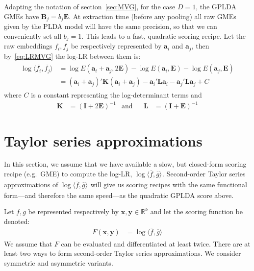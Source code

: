 \documentclass[a4paper,oneside,12pt,english]{report}
\def\expv#1#2{\bigl\langle#1\bigr\rangle_{#2}}
\def\R{\mathbb{R}}
\def\Lmat{\mathbf{L}}
\def\Bmat{\mathbf{B}}
\def\Emat{\mathbf{E}}
\def\Imat{\mathbf{I}}
\def\Kmat{\mathbf{K}}
\def\yvec{\mathbf{y}}
\def\xvec{\mathbf{x}}
\def\avec{\mathbf{a}}
\def\dot#1#2{\expv{#1,#2}{}}
\def\normal#1{\overline{#1}}
\def\dotn#1#2{\dot{\normal{#1}}{\normal{#2}}}
\begin{document}
Adapting the notation of section~\ref{sec:MVG}, for the case $D=1$, the GPLDA GMEs have $\Bmat_j=b_j\Emat$. At extraction time (before any pooling) all raw GMEs given by the PLDA model will have the same precision, so that we can conveniently set all $b_j=1$. This leads to a fast, quadratic scoring recipe. Let the raw embeddings $f_i,f_j$ be respectively represented by $\avec_i$ and $\avec_j$, then by~\eqref{eq:LRMVG} the log-LR between them is:
\begin{align}
\label{eq:PLDAscore}
\begin{split}
\log\dotn{f_i}{f_j} &=\log E(\avec_i+\avec_j,2\Emat)  -\log E(\avec_i,\Emat) -\log E(\avec_j,\Emat) \\
&= (\avec_i+\avec_j)' \Kmat (\avec_i+\avec_j)
-\avec_i' \Lmat \avec_i -\avec_j' \Lmat \avec_j + C
\end{split}
\end{align} 
where $C$ is a constant representing the log-determinant terms and
\begin{align}
\Kmat &= (\Imat+2\Emat)^{-1}&\text{and} && \Lmat &=(\Imat+\Emat)^{-1}
\end{align}

\section{Taylor series approximations}
\label{sec:TSapr}
In this section, we assume that we have available a slow, but closed-form scoring recipe (e.g.\ GME) to compute the log-LR, $\log\dotn{f}{g}$. Second-order Taylor series approximations of $\log\dotn{f}{g}$ will give us scoring recipes with the same functional form---and therefore the same speed---as the quadratic GPLDA score above. 

Let $f,g$ be represented respectively by $\xvec,\yvec\in\R^k$ and let the scoring function be denoted: 
\begin{align}
F(\xvec,\yvec) &= \log\dotn{f}{g}
\end{align} 
We assume that $F$ can be evaluated and differentiated at least twice. There are at least two ways to form second-order Taylor series approximations. We consider symmetric and asymmetric variants.
\end{document}
